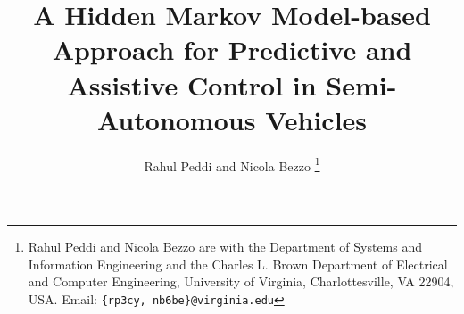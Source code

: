 \documentclass[letterpaper, 10 pt, conference]{ieeeconf}  %
\begin{document}
%
\title{\LARGE \bf A Hidden Markov Model-based Approach for Predictive and Assistive Control in Semi-Autonomous Vehicles}
\author{Rahul Peddi and Nicola Bezzo%
\thanks{Rahul Peddi and Nicola Bezzo are with the Department of Systems and Information Engineering and the Charles L. Brown Department of Electrical and Computer Engineering, University of Virginia, Charlottesville, VA 22904, USA. Email: {\tt \{rp3cy, nb6be\}@virginia.edu}}
}





\maketitle
\end{document}
